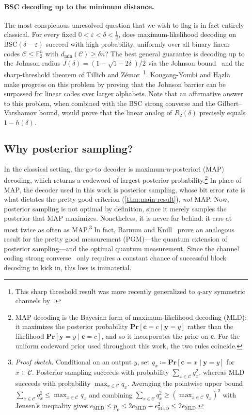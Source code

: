 \documentclass[11pt]{article}
\renewcommand{\leq}{\leqslant}
\renewcommand{\geq}{\geqslant}
\theoremstyle{remark}
\newcommand{\cC}{\mathcal{C}}
\newcommand{\F}{\mathbb{F}}
\newcommand{\Prb}{\mathbf{Pr}}
\newcommand{\bc}{\mathbf{c}}
\newcommand{\by}{\mathbf{y}}
\newcommand{\eps}{\varepsilon}
\newcommand{\BSC}{\mathrm{BSC}}
\begin{document}
\paragraph{BSC decoding up to the minimum distance.}
\label{open:bsc-distance-decoding}
The most conspicuous unresolved question that we wish to flag is in fact entirely classical. For every fixed $0 < \eps < \delta < \frac{1}{2}$, does maximum-likelihood decoding on $\BSC(\delta-\eps)$ succeed with high probability, uniformly over all binary linear codes $\cC \leq \F_2^n$ with $d_{\min}(\cC) \geq \delta n$? The best general guarantee is decoding up to the Johnson radius $J(\delta) = (1-\sqrt{1-2\delta})/2$ via the Johnson bound~\cite{Joh62} and the sharp-threshold theorem of Tillich and Z\'emor~\cite{TZ00}\footnote{This sharp threshold result was more recently generalized to $q$-ary symmetric channels by~\cite{PSW24}.}. Kougang-Yombi and H\k{a}z{\l}a~\cite{KYH26} make progress on this problem by proving that the Johnson barrier can be surpassed for linear codes over larger alphabets. Note that an affirmative answer to this problem, when combined with the BSC strong converse and the Gilbert--Varshamov bound, would prove that the linear analog of $R_2(\delta)$ precisely equals $1-h(\delta)$.

\subsection{Why posterior sampling?}
\label{subsec:why-posterior}

In the classical setting, the go-to decoder is maximum-a-posteriori (MAP) decoding, which returns a codeword of largest posterior probability.\footnote{MAP decoding is the Bayesian form of maximum-likelihood decoding (MLD): it maximizes the posterior probability $\Prb[\bc = c \mid \by = y]$ rather than the likelihood $\Prb[\by = y \mid \bc = c]$, and so it incorporates the prior on $\bc$. For the uniform codeword prior used throughout this work, the two rules coincide.} In place of MAP, the decoder used in this work is posterior sampling, whose bit error rate is what dictates the pretty good criterion (\cref{thm:main-result}), \emph{not} MAP. Now, posterior sampling is not optimal by definition, since it merely samples the posterior that MAP maximizes. Nonetheless, it is never far behind: it errs at most twice as often as MAP.\footnote{\emph{Proof sketch.} Conditional on an output $y$, set $q_x \coloneqq \Prb[\bc = x \mid \by = y]$ for $x \in \cC$. Posterior sampling succeeds with probability $\sum_{x \in \cC}{q_x^2}$, whereas MLD succeeds with probability $\max_{x \in \cC}{q_x}$. Averaging the pointwise upper bound $\sum_{x \in \cC}{q_x^2} \leq \max_{x \in \cC}{q_x}$ and combining $\sum_{x \in \cC}{q_x^2} \geq (\max_{x \in \cC}{q_x})^2$ with Jensen's inequality gives $e_{\mathrm{MLD}} \leq p_{\mathrm{e}} \leq 2e_{\mathrm{MLD}}-e_{\mathrm{MLD}}^2 \leq 2e_{\mathrm{MLD}}$.} In fact, Barnum and Knill~\cite{BK02} prove an analogous result for the pretty good measurement (PGM)---the quantum extension of posterior sampling---and the optimal quantum measurement. Since the channel coding strong converse~\cite{Wol57,Str64,Ari73,Win99a,ON99} only requires a constant chance of successful block decoding to kick in, this loss is immaterial. 
\end{document}
